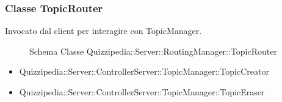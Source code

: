 \subsubsection{Classe TopicRouter}
Invocato dal client per interagire con TopicManager.
\begin{figure}[H]
\centering
\noindent{}
\caption{Schema Classe Quizzipedia::Server::RoutingManager::TopicRouter}
\end{figure}
\begin{itemize}
\item Quizzipedia::Server::ControllerServer::TopicManager::TopicCreator
\item Quizzipedia::Server::ControllerServer::TopicManager::TopicEraser
\end{itemize}

